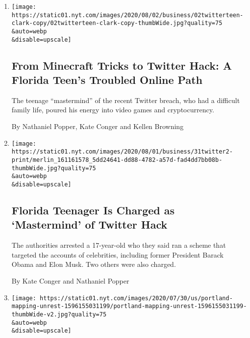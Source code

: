 \begin{enumerate}
\def\labelenumi{\arabic{enumi}.}
\item
  \href{/2020/08/02/technology/florida-teenager-twitter-hack.html}{}

  \texttt{[image: https://static01.nyt.com/images/2020/08/02/business/02twitterteen-clark-copy/02twitterteen-clark-copy-thumbWide.jpg?quality=75\\\&auto=webp\\\&disable=upscale]}

  \hypertarget{from-minecraft-tricks-to-twitter-hack-a-florida-teens-troubled-online-path}{%
  \subsection{From Minecraft Tricks to Twitter Hack: A Florida Teen's
  Troubled Online
  Path}\label{from-minecraft-tricks-to-twitter-hack-a-florida-teens-troubled-online-path}}

  The teenage ``mastermind'' of the recent Twitter breach, who had a
  difficult family life, poured his energy into video games and
  cryptocurrency.

  By Nathaniel Popper, Kate Conger and Kellen Browning
\item
  \href{/2020/07/31/technology/twitter-hack-arrest.html}{}

  \texttt{[image: https://static01.nyt.com/images/2020/08/01/business/31twitter2-print/merlin\_161161578\_5dd24641-dd88-4782-a57d-fad4dd7bb08b-thumbWide.jpg?quality=75\\\&auto=webp\\\&disable=upscale]}

  \hypertarget{florida-teenager-is-charged-as-mastermind-of-twitter-hack}{%
  \subsection{Florida Teenager Is Charged as `Mastermind' of Twitter
  Hack}\label{florida-teenager-is-charged-as-mastermind-of-twitter-hack}}

  The authorities arrested a 17-year-old who they said ran a scheme that
  targeted the accounts of celebrities, including former President
  Barack Obama and Elon Musk. Two others were also charged.

  By Kate Conger and Nathaniel Popper
\item
  \href{/interactive/2020/07/31/us/portland-protests-map-photos.html}{}

  \texttt{[image: https://static01.nyt.com/images/2020/07/30/us/portland-mapping-unrest-1596155031199/portland-mapping-unrest-1596155031199-thumbWide-v2.jpg?quality=75\\\&auto=webp\\\&disable=upscale]}


\end{enumerate}
